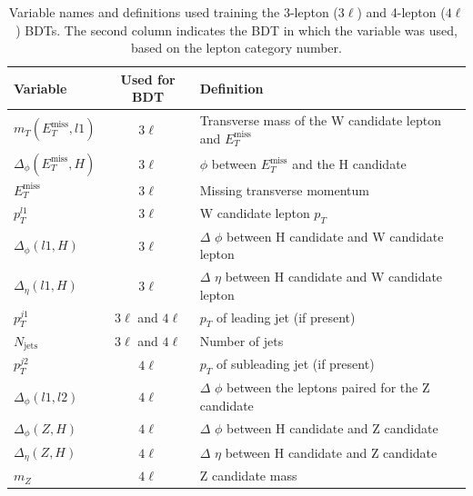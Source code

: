 \begin{table}[htp]
\caption{Variable names and definitions used training the 3-lepton ($3\ell$) and 4-lepton ($4\ell$) BDTs. The second column indicates the BDT in which the variable was used, based on the lepton category number.}
\begin{center}
\begin{tabular}{l c l l}
\toprule
Variable & Used for BDT & Definition \\
\midrule
  $m_T(E_T^\text{miss},l1)$ & $3\ell$ & Transverse mass of the W candidate lepton and $E_T^\text{miss}$  \\
  $\Delta_\phi(E_T^\text{miss},H)$ & $3\ell$ & $\phi$ between $E_T^\text{miss}$ and the H candidate \\
  $E_T^\text{miss}$ & $3\ell$ & Missing transverse momentum \\
  $p_T^{l1}$ & $3\ell$ & W candidate lepton $p_T$ \\
  $\Delta_\phi(l1,H)$ & $3\ell$ & $\Delta$ $\phi$ between H candidate and W candidate lepton \\
  $\Delta_\eta(l1,H)$ & $3\ell$ & $\Delta$ $\eta$ between H candidate and W candidate lepton \\
  $p_T^{j1}$ & $3\ell$ and $4\ell$ & $p_T$ of leading jet (if present) \\
  $N_\text{jets}$ & $3\ell$ and $4\ell$ & Number of jets \\
  $p_T^{j2}$ & $4\ell$ & $p_T$ of subleading jet (if present) \\
  $\Delta_\phi(l1,l2)$ & $4\ell$ & $\Delta$ $\phi$ between the leptons paired for the Z candidate \\
  $\Delta_\phi(Z,H)$ & $4\ell$ & $\Delta$ $\phi$ between H candidate and Z candidate \\
  $\Delta_\eta(Z,H)$ & $4\ell$ & $\Delta$ $\eta$ between H candidate and Z candidate \\
  $m_Z$ & $4\ell$ & Z candidate mass \\
\bottomrule
\end{tabular}
\label{tab:hmmVarNames}
\end{center}
\end{table}


